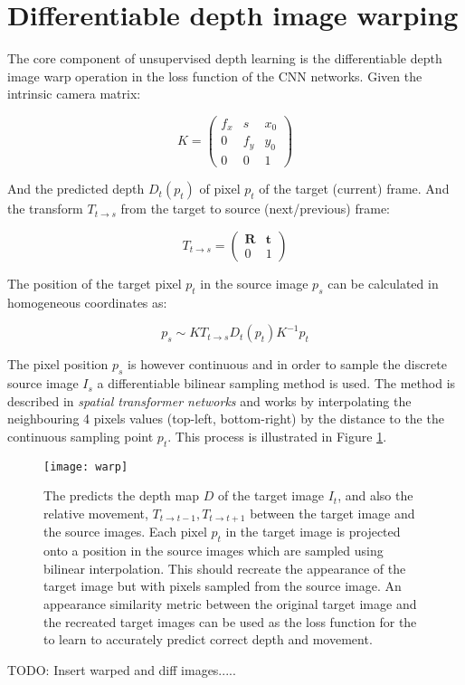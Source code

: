 \section{Differentiable depth image warping}
\label{sec:diffwarp}

The core component of unsupervised depth learning is the differentiable depth image warp operation in the loss function of the CNN networks. Given the intrinsic camera matrix:

\[
K = 
\begin{pmatrix}
f_x & s & x_0 \\
0 & f_y & y_0 \\
0 & 0   & 1
\end{pmatrix}
\]

And the predicted depth $ D_t(p_t) $ of pixel $ p_t $ of the target (current) frame. And the transform $ T_{t \rightarrow s} $ from the target to source (next/previous) frame:

\[
T_{t \rightarrow s} =
\begin{pmatrix}
\textbf{R} & \textbf{t} \\
0 & 1
\end{pmatrix}
\]

The position of the target pixel $ p_t $ in the source image $ p_s $ can be calculated in homogeneous coordinates as:

\[
p_s \sim K T_{t \rightarrow s} D_t(p_t) K^{-1} p_t 
\]

The pixel position $ p_s $ is however continuous and in order to sample the discrete source image $ I_s $ a differentiable bilinear sampling method is used. The method is described in \textit{spatial transformer networks}\cite{spatialtransformernetworks} and works by interpolating the neighbouring 4 pixels values (top-left, bottom-right) by the distance to the the continuous sampling point $ p_t $. This process is illustrated in Figure \ref{fig:warp}.


\begin{figure}[H]
	\centering
	\texttt{[image: warp]}
	\caption{The \abbrCNN predicts the depth map $D$ of the target image $I_t$, and also the relative movement, $T_{t\rightarrow t-1}, T_{t\rightarrow t+1}$ between the target image and the source images. Each pixel $p_t$ in the target image is projected onto a position in the source images which are sampled using bilinear interpolation. This should recreate the appearance of the target image but with pixels sampled from the source image. An appearance similarity metric between the original target image and the recreated target images can be used as the loss function for the \abbrCNN to learn to accurately predict correct depth and movement.}
	\label{fig:warp}
\end{figure}

TODO: Insert warped and diff images.....